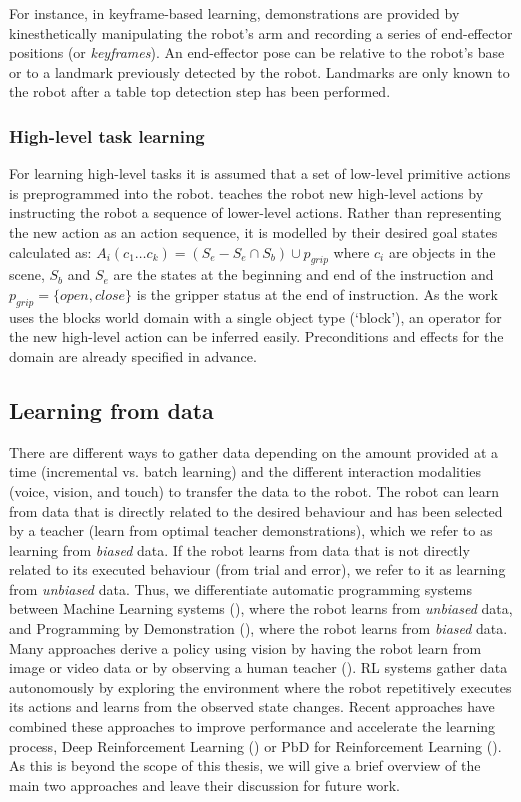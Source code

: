 For instance, in keyframe-based learning, demonstrations are provided by kinesthetically manipulating the robot's arm and recording a series of end-effector positions (or \textit{keyframes}). 
An end-effector pose can be relative to the robot's base or to a landmark previously detected by the robot.
Landmarks are only known to the robot after a table top detection step has been performed.

\subsubsection{High-level task learning}\label{ssec:highlevel}
For learning high-level tasks it is assumed that a set of low-level primitive actions is preprogrammed into the robot. 
\cite{she2014teaching} teaches the robot new high-level actions by instructing the robot a sequence of lower-level actions.
Rather than representing the new action as an action sequence, it is modelled by their desired goal states calculated as:
$A_i(c_1 \dots c_k) = (S_e - S_e \cap S_b) \cup p_{grip}$ where $c_i$ are objects in the scene, $S_b$ and $S_e$ are the states at the beginning and end of the instruction and $p_{grip} = \{open, close\}$ is the gripper status at the end of instruction.
As the work uses the blocks world domain with a single object type (`block'), an operator for the new high-level action can be inferred easily. Preconditions and effects for the domain are already specified in advance.

\subsection{Learning from data} \label{subsec:Gathering data}
There are different ways to gather data depending on the amount provided at a time (incremental vs. batch learning) and the different interaction modalities (voice, vision, and touch) to transfer the data to the robot.
The robot can learn from data that is directly related to the desired behaviour and has been selected by a teacher (\eg learn from optimal teacher demonstrations), which we refer to as learning from \textit{biased} data.
If the robot learns from data that is not directly related to its executed behaviour (\eg from trial and error), we refer to it as learning from \textit{unbiased} data.
Thus, we differentiate automatic programming systems between Machine Learning systems (), where the robot learns from \textit{unbiased} data, and Programming by Demonstration (), where the robot learns from \textit{biased} data.
Many approaches derive a policy using vision by having the robot learn from image or video data or by observing a human teacher (\cite{kuniyoshi1994learning}).
RL systems gather data autonomously by exploring the environment where the robot repetitively executes its actions and learns from the observed state changes.
Recent approaches have combined these approaches to improve performance and accelerate the learning process, \eg Deep Reinforcement Learning (\cite{arulkumaran2017brief}) or PbD for Reinforcement Learning (\cite{hester2017learning}).
As this is beyond the scope of this thesis, we will give a brief overview of the main two approaches and leave their discussion for future work.


